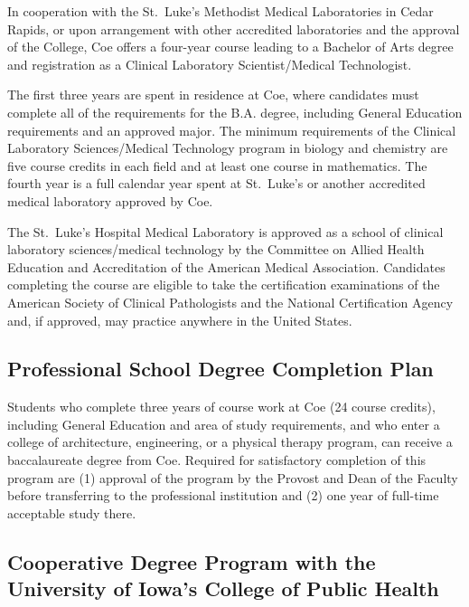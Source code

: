 \documentclass[
  letterpaper,
]{scrbook}
\begin{document}
In cooperation with the St.~Luke's Methodist Medical Laboratories in
Cedar Rapids, or upon arrangement with other accredited laboratories and
the approval of the College, Coe offers a four-year course leading to a
Bachelor of Arts degree and registration as a Clinical Laboratory
Scientist/Medical Technologist.

The first three years are spent in residence at Coe, where candidates
must complete all of the requirements for the B.A. degree, including
General Education requirements and an approved major. The minimum
requirements of the Clinical Laboratory Sciences/Medical Technology
program in biology and chemistry are five course credits in each field
and at least one course in mathematics. The fourth year is a full
calendar year spent at St.~Luke's or another accredited medical
laboratory approved by Coe.

The St.~Luke's Hospital Medical Laboratory is approved as a school of
clinical laboratory sciences/medical technology by the Committee on
Allied Health Education and Accreditation of the American Medical
Association. Candidates completing the course are eligible to take the
certification examinations of the American Society of Clinical
Pathologists and the National Certification Agency and, if approved, may
practice anywhere in the United States.

\subsection{Professional School Degree Completion
Plan}\label{professional-school-degree-completion-plan}

Students who complete three years of course work at Coe (24 course
credits), including General Education and area of study requirements,
and who enter a college of architecture, engineering, or a physical
therapy program, can receive a baccalaureate degree from Coe. Required
for satisfactory completion of this program are (1) approval of the
program by the Provost and Dean of the Faculty before transferring to
the professional institution and (2) one year of full-time acceptable
study there.

\subsection{Cooperative Degree Program with the University of Iowa's
College of Public
Health}\label{cooperative-degree-program-with-the-university-of-iowas-college-of-public-health}
\end{document}
